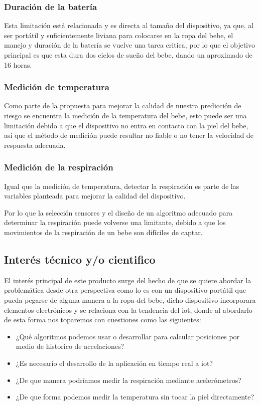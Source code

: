 \subsubsection{Duración de la batería}

Esta limitación está relacionada y es directa al tamaño del dispositivo, ya que, al ser portátil y suficientemente liviana para colocarse en la ropa del bebe, el manejo y duración de la batería se vuelve una tarea critica, por lo que el objetivo principal es que esta dura dos ciclos de sueño del bebe, dando un aproximado de 16 horas.

\subsubsection{Medición de temperatura}

Como parte de la propuesta para mejorar la calidad de nuestra predicción de riesgo se encuentra la medición de la temperatura del bebe, esto puede ser una limitación debido a que el dispositivo no entra en contacto con la piel del bebe, así que el método de medición puede resultar no fiable o no tener la velocidad de respuesta adecuada.

\subsubsection{Medición de la respiración}

Igual que la medición de temperatura, detectar la respiración es parte de las variables planteada para mejorar la calidad del dispositivo.

Por lo que la selección sensores y el diseño de un algoritmo adecuado para determinar la respiración puede volverse una limitante, debido a que los movimientos de la respiración de un bebe son difíciles de captar.

\subsection{Interés técnico y/o cientifico}
El interés principal de este producto surge del hecho de que se quiere abordar la problemática desde otra perspectiva como lo es con un dispositivo portátil que pueda pegarse de alguna manera a la ropa del bebe, dicho dispositivo incorporara elementos electrónicos y se relaciona con la tendencia del \acrshort{iot}, donde al abordarlo de esta forma nos toparemos con cuestiones como las siguientes:

\begin{itemize}
    \item ¿Qué algoritmos podemos usar o desarrollar para calcular posiciones por medio de historico de accelaciones?
    \item ¿Es necesario el desarrollo de la aplicación en tiempo real a \acrshort{iot}?
    \item ¿De que manera podríamos medir la respiración mediante acelerómetros?
    \item ¿De que forma podemos medir la temperatura sin tocar la piel directamente?
\end{itemize}

